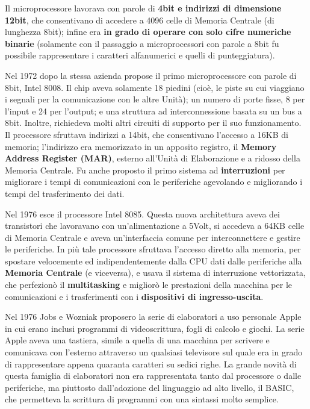 \documentclass[12pt]{article} %
\begin{document}
Il microprocessore lavorava con parole di\textbf{ 4bit e indirizzi di dimensione 12bit}, che consentivano di accedere a 4096 celle di Memoria Centrale (di lunghezza 8bit); infine era \textbf{in grado di operare con solo cifre numeriche binarie }(solamente con il passaggio a microprocessori con parole a 8bit fu possibile rappresentare i caratteri alfanumerici e quelli di punteggiatura).\par\medskip\noindent
Nel 1972 dopo la stessa azienda propose il primo microprocessore con parole di 8bit, Intel 8008. Il chip aveva solamente 18 piedini (cioè, le piste su cui viaggiano i segnali per la comunicazione con le altre Unità); un numero di porte fisse, 8 per l’input e 24 per l’output; e una struttura ad interconnessione basata su un bus a 8bit. Inoltre, richiedeva molti altri circuiti di supporto per il suo funzionamento. Il processore sfruttava indirizzi a 14bit, che consentivano l’accesso a 16KB di memoria; l’indirizzo era memorizzato in un apposito registro, il \textbf{Memory Address Register (MAR)}, esterno all’Unità di Elaborazione e a ridosso della Memoria Centrale. Fu anche proposto il primo sistema ad \textbf{interruzioni} per migliorare i tempi di comunicazioni con le periferiche agevolando e migliorando i tempi del trasferimento dei dati.\par\medskip\noindent
Nel 1976 esce il processore Intel 8085. Questa nuova architettura aveva dei transistori che lavoravano con un’alimentazione a 5Volt, si accedeva a 64KB celle di Memoria Centrale e aveva un’interfaccia comune per interconnettere e gestire le periferiche. In più tale processore sfruttava l’accesso diretto alla memoria, per spostare velocemente ed indipendentemente dalla CPU dati dalle periferiche alla\textbf{ Memoria Centrale }(e viceversa), e usava il sistema di interruzione vettorizzata, che perfezionò il \textbf{multitasking} e migliorò le prestazioni della macchina per le comunicazioni e i trasferimenti con i \textbf{dispositivi di ingresso-uscita}.\par\medskip\noindent
Nel 1976 Jobs e Wozniak proposero la serie di elaboratori a uso personale Apple in cui erano inclusi programmi di videoscrittura, fogli di calcolo e giochi. La serie Apple aveva una tastiera, simile a quella di una macchina per scrivere e comunicava con l’esterno attraverso un qualsiasi televisore sul quale era in grado di rappresentare appena quaranta caratteri su sedici righe. La grande novità di questa famiglia di elaboratori non era rappresentata tanto dal processore o dalle periferiche, ma piuttosto dall’adozione del linguaggio ad alto livello, il BASIC, che permetteva la scrittura di programmi con una sintassi molto semplice.\par\medskip\noindent
\end{document}
